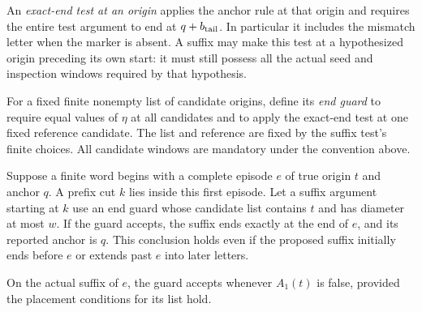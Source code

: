 An \emph{exact-end test at an origin} applies the anchor rule at that
origin and requires the entire test argument to end at
$q+b_{\rm tail}$.  In particular it includes the mismatch letter when
the marker is absent.  A suffix may make this test at a hypothesized
origin preceding its own start: it must still possess all the actual
seed and inspection windows required by that hypothesis.

For a fixed finite nonempty list of candidate origins, define its
\emph{end guard} to require equal values of $\eta$ at all candidates
and to apply the exact-end test at one fixed reference candidate.  The
list and reference are fixed by the suffix test's finite choices.  All
candidate windows are mandatory under the convention above.

\begin{lemma}
\label{lem:end-guard}
Suppose a finite word begins with a complete episode $e$ of true origin
$t$ and anchor $q$.  A prefix cut $k$ lies inside this first episode.
Let a suffix argument starting at $k$ use an end guard whose candidate
list contains $t$ and has diameter at most $w$.  If the guard accepts,
the suffix ends exactly at the end of $e$, and its reported anchor is
$q$.  This conclusion holds even if the proposed suffix initially ends
before $e$ or extends past $e$ into later letters.

On the actual suffix of $e$, the guard accepts whenever $A_1(t)$ is
false, provided the placement conditions for its list hold.
\end{lemma}

